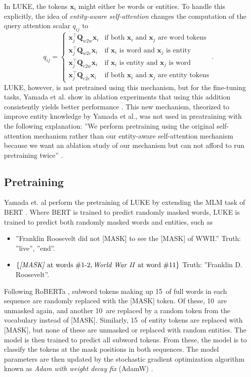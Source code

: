 \documentclass[main.tex]{subfiles}
\begin{document}
In LUKE, the tokens $\mathbf x_i$ might either be words or entities.
To handle this explicitly, the idea of \emph{entity-aware self-attention} changes the computation of the query attention scalar $q_{ij}$ to
\begin{equation}
    q_{ij} = 
    \begin{cases}
    \mathbf x_j^\top \mathbf Q_{w2w} \mathbf x_i  & \text{if both $\mathbf x_i$ and $\mathbf x_j$ are word tokens}\\
    \mathbf x_j^\top \mathbf Q_{w2e} \mathbf x_i & \text{if $\mathbf x_i$ is word and $\mathbf x_j$ is entity}\\
    \mathbf x_j^\top \mathbf Q_{e2w} \mathbf x_i & \text{if $\mathbf x_i$ is entity and $\mathbf x_j$ is word}\\
    \mathbf x_j^\top \mathbf Q_{e2e} \mathbf x_i & \text{if both $\mathbf x_i$ and $\mathbf x_j$ are entity tokens}
    \end{cases}.
\end{equation}
LUKE, however, is not pretrained using this mechanism, but for the fine-tuning tasks, Yamada et al. show in ablation experiments that using this addition consistently yields better performance \cite[Sec. 5.2]{yamada2020luke}.
This new mechanism, theorized to improve entity knowledge by Yamada et al., was  not used in preatraining with the following explanation:
''We perform pretraining using the original self-attention mechanism rather than our entity-aware self-attention mechanism because we want an ablation study of our mechanism but can not afford to run pretraining twice'' \cite[Sec. 3.4]{yamada2020luke}.

\subsection{Pretraining}
\label{subsec:lukepre}
Yamada et. al perform the pretraining of LUKE by extending the MLM task of BERT \cite{devlin2019bert}.
Where BERT is trained to predict randomly masked words, LUKE is trained to predict both randomly masked words and entities, such as
\begin{itemize}
    \item ''Franklin Roosevelt did not [MASK] to see the [MASK] of WWII.''
        \subitem Truth: ''live'', ''end''.
    \item $\{\text{\emph{[MASK]} at words \#1-2}, \text{\emph{World War II} at word \#11}\}$
        \subitem Truth: ''Franklin D. Roosevelt''.
\end{itemize}
Following RoBERTa \cite{liu2019roberta}, subword tokens making up 15\pro\ of full words in each sequence are randomly replaced with the [MASK] token.
Of these, 10\pro\ are unmasked again, and another 10\pro\ are replaced by a random token from the vocabulary instead of [MASK].
Similarly, 15\pro\ of entity tokens are replaced with [MASK], but none of these are unmasked or replaced with random entities.
The model is then trained to predict all subword tokens.
From these, the model is to classify the tokens at the mask positions in both sequences.
The model parameters are then updated by the stochastic gradient optimization algorithm known as \emph{Adam with weight decay fix} (AdamW) \cite{hutter2019adamw}.
\end{document}
